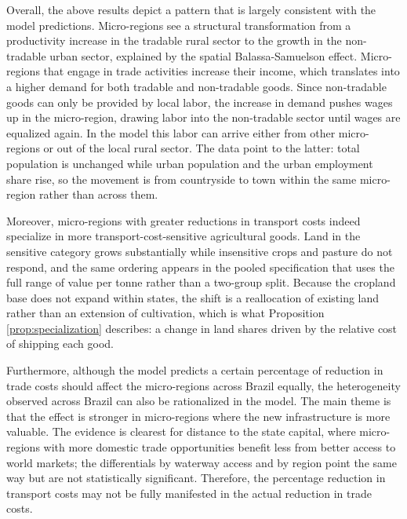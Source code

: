 \documentclass[11pt]{article}
\begin{document}
Overall, the above results depict a pattern that is largely consistent with the model predictions. Micro-regions see a structural transformation from a productivity increase in the tradable rural sector to the growth in the non-tradable urban sector, explained by the spatial Balassa-Samuelson effect. Micro-regions that engage in trade activities increase their income, which translates into a higher demand for both tradable and non-tradable goods. Since non-tradable goods can only be provided by local labor, the increase in demand pushes wages up in the micro-region, drawing labor into the non-tradable sector until wages are equalized again. In the model this labor can arrive either from other micro-regions or out of the local rural sector. The data point to the latter: total population is unchanged while urban population and the urban employment share rise, so the movement is from countryside to town within the same micro-region rather than across them.

Moreover, micro-regions with greater reductions in transport costs indeed specialize in more transport-cost-sensitive agricultural goods. Land in the sensitive category grows substantially while insensitive crops and pasture do not respond, and the same ordering appears in the pooled specification that uses the full range of value per tonne rather than a two-group split. Because the cropland base does not expand within states, the shift is a reallocation of existing land rather than an extension of cultivation, which is what Proposition \ref{prop:specialization} describes: a change in land shares driven by the relative cost of shipping each good.

Furthermore, although the model predicts a certain percentage of reduction in trade costs should affect the micro-regions across Brazil equally, the heterogeneity observed across Brazil can also be rationalized in the model. The main theme is that the effect is stronger in micro-regions where the new infrastructure is more valuable. The evidence is clearest for distance to the state capital, where micro-regions with more domestic trade opportunities benefit less from better access to world markets; the differentials by waterway access and by region point the same way but are not statistically significant. Therefore, the percentage reduction in transport costs may not be fully manifested in the actual reduction in trade costs.
\end{document}
